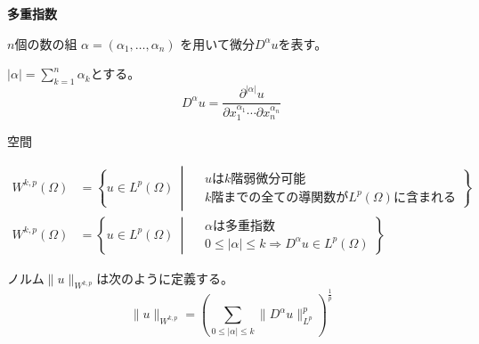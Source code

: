 \documentclass[12pt,b5paper]{ltjsarticle}
\begin{document}
\dotfill

\textbf{多重指数}

$n$個の数の組
$\alpha = (\alpha_{1},\dots , \alpha_{n})$
を用いて微分$D^{\alpha}u$を表す。

$\lvert \alpha \rvert = \sum_{k=1}^{n}\alpha_{k}$とする。
\begin{equation}
 D^{\alpha}u = \frac{\partial^{\lvert \alpha \rvert} u}{\partial x_{1}^{\alpha_{1}}\cdots\partial x_{n}^{\alpha_{n}}}
\end{equation}

\dotfill


空間

\begin{align}
 W^{k,p}(\Omega) &= \left\{ u\in L^{p}(\Omega) \: \middle| \:
  \begin{aligned}
   & u は k 階弱微分可能\\
   & k 階までの全ての導関数が L^{p}(\Omega) に含まれる
  \end{aligned}
 \right\}\\
 W^{k,p}(\Omega) &= \left\{ u\in L^{p}(\Omega) \: \middle| \:
  \begin{aligned}
   & \alpha は 多重指数\\
   & 0 \leq \lvert \alpha \rvert \leq k \Rightarrow D^{\alpha}u \in L^{p}(\Omega)
  \end{aligned}
 \right\}
\end{align}


ノルム$\| u \|_{W^{k,p}}$は次のように定義する。
\begin{equation}
 \| u \|_{W^{k,p}} =
  \left( \sum_{0 \leq \lvert \alpha \rvert \leq k} \| D^{\alpha} u \|_{L^{p}}^{p} \right)^{\frac{1}{p}}
\end{equation}


\hrulefill
\end{document}
